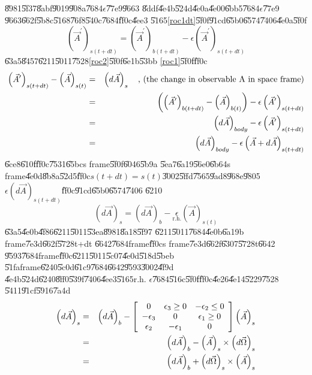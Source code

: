 \documentclass[12pt,a4paper]{article}
\begin{document}
\U{8981}\U{5f37}\U{8abf}\U{9019}\U{908a}\U{7684}$\epsilon $\U{77e9}\U{9663}%
\U{8ddf}\U{4e4b}\U{524d}\U{4e0a}\U{4e00}\U{6bb5}\U{7684}$\epsilon $\U{77e9}%
\U{9663}\U{662f}\U{5b8c}\U{5168}\U{76f8}\U{540c}\U{7684}\U{ff0c}\U{4ee3}%
\U{5165}\ref{roc1dt}\U{5f0f}\U{91cd}\U{65b0}\U{6574}\U{7406}\U{4e0a}\U{5f0f}%
\begin{equation}
\left( \vec{A}^{\prime }\right) _{s(t+dt)}=\left( \vec{A}^{\prime }\right)
_{b(t+dt)}-\epsilon \left( \vec{A}^{\prime }\right) _{s(t+dt)}  \label{roc2}
\end{equation}%
\U{63a5}\U{8457}\U{6211}\U{5011}\U{7528}\ref{roc2}\U{5f0f}\U{6e1b}\U{53bb}%
\ref{roc1}\U{5f0f}\U{ff0c}%
\begin{eqnarray}
\left( \vec{A}^{\prime }\right) _{s(t+dt)}-\left( \vec{A}\right) _{s(t)}
&=&\left( d\vec{A}\right) _{s}\text{ , (the change in observable A in space
frame)}  \notag \\
&=&\left( \left( \vec{A}^{\prime }\right) _{b(t+dt)}-\left( \vec{A}\right)
_{b(t)}\right) -\epsilon \left( \vec{A}^{\prime }\right) _{s(t+dt)}  \notag
\\
&=&\left( d\vec{A}\right) _{body}-\epsilon \left( \vec{A}^{\prime }\right)
_{s(t+dt)}  \notag \\
&=&\left( d\vec{A}\right) _{body}-\epsilon \left( \vec{A}+d\vec{A}\right)
_{s(t+dt)}  \label{roc4}
\end{eqnarray}%
\U{6ce8}\U{610f}\U{ff0c}\U{7531}\U{65bc}s frame\U{5f0f}\U{6046}\U{5b9a}%
\U{5ea7}\U{6a19}\U{56e0}\U{6b64}s frame\U{4e0d}\U{8b8a}\U{52d5}\U{ff0c}$%
s(t+dt)=s(t)$\U{3002}\U{5ffd}\U{7565}\U{9ad8}\U{968e}\U{9805}$\epsilon
\left( d\vec{A}\right) _{s(t+dt)}$\U{ff0c}\U{91cd}\U{65b0}\U{6574}\U{7406}%
\U{6210}%
\begin{equation*}
\left( d\vec{A}\right) _{s}=\left( d\vec{A}\right) _{b}-\underset{\text{r.h.}%
}{\epsilon }\left( \vec{A}\right) _{s(t)}
\end{equation*}%
\U{63a5}\U{4e0b}\U{4f86}\U{6211}\U{5011}\U{53ea}\U{8981}\U{8a18}\U{5f97}%
\U{6211}\U{5011}\U{7684}\U{4e0b}\U{6a19}b frame\U{7e3d}\U{662f}\U{5728}t+dt%
\U{6642}\U{7684}frame\U{ff0c}s frame\U{7e3d}\U{662f}\U{6307}\U{5728}t\U{6642}%
\U{9593}\U{7684}frame\U{ff0c}\U{6211}\U{5011}\U{5c07}\U{4e0d}\U{518d}\U{5beb}%
\U{51fa}frame\U{6240}\U{5c0d}\U{61c9}\U{7684}\U{6642}\U{9593}\U{3002}\U{4f9d}%
\U{4e4b}\U{524d}\U{6240}\U{8ff0}\U{539f}\U{7406}\U{4ee3}\U{5165}r.h. $%
\epsilon $\U{7684}\U{516c}\U{5f0f}\U{ff0c}\U{4e26}\U{4e14}\U{5229}\U{7528}%
\U{5411}\U{91cf}\U{5916}\U{7a4d}%
\begin{eqnarray}
\left( d\vec{A}\right) _{s} &=&\left( d\vec{A}\right) _{b}-\left[ 
\begin{array}{ccc}
0 & \epsilon _{3}\geq 0 & -\epsilon _{2}\leq 0 \\ 
-\epsilon _{3} & 0 & \epsilon _{1}\geq 0 \\ 
\epsilon _{2} & -\epsilon _{1} & 0%
\end{array}%
\right] \left( \vec{A}\right) _{s}  \notag \\
&=&\left( d\vec{A}\right) _{b}-\left( \vec{A}\right) _{s}\times \left( d\vec{%
\Omega}\right) _{s}  \label{roc3} \\
&=&\left( d\vec{A}\right) _{b}+\left( d\vec{\Omega}\right) _{s}\times \left( 
\vec{A}\right) _{s}  \notag
\end{eqnarray}%
\end{document}
